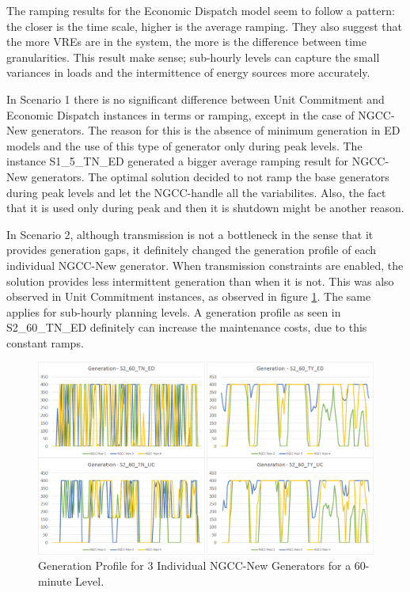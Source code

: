 \documentclass[12pt,LUDisStyle,twosided]{book}
\begin{document}
The ramping results for the Economic Dispatch model seem to follow a pattern: the closer is the time scale, higher is the average ramping. They also suggest that the more VREs are in the system, the more is the difference between time granularities. This result make sense; sub-hourly levels can capture the small variances in loads and the intermittence of energy sources more accurately. 

In Scenario 1 there is no significant difference between Unit Commitment and Economic Dispatch instances in terms or ramping, except in the case of NGCC-New generators. The reason for this is the absence of minimum generation in ED models and the use of this type of generator only during peak levels. The instance S1\_5\_TN\_ED generated a bigger average ramping result for NGCC-New generators. The optimal solution decided to not ramp the base generators during peak levels and let the NGCC-handle all the variabilites. Also, the fact that it is used only during peak and then it is shutdown might be another reason.

In Scenario 2, although transmission is not a bottleneck in the sense that it provides generation gaps, it definitely changed the generation profile of each individual NGCC-New generator. When transmission constraints are enabled, the solution provides less intermittent generation than when it is not. This was also observed in Unit Commitment instances, as observed in figure    \ref{fig:generationProfileNGCC}. The same applies for sub-hourly planning levels. A generation profile as seen in S2\_60\_TN\_ED definitely can increase the maintenance costs, due to this constant ramps.

\begin{figure}[H] 
  \centering
  
	  \includegraphics[width=\textwidth,keepaspectratio]{generationProfileNGCC.png}
  
  \caption{Generation Profile for 3 Individual NGCC-New Generators for a 60-minute Level.}
  \label{fig:generationProfileNGCC}
  
\end{figure}
\end{document}
